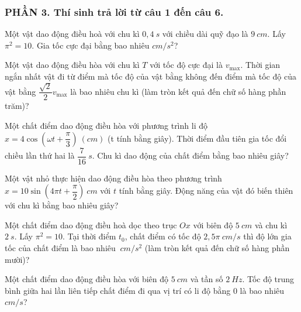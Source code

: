 \subsubsection*{PHẦN 3. Thí sinh trả lời từ câu 1 đến câu 6.}
\setcounter{ex}{0}
\begin{ex}
	Một vật dao động điều hoà với chu kì $0,4\ s$ với chiều dài quỹ đạo là $9\ cm$. Lấy $\pi^2=10$. Gia tốc cực đại bằng bao nhiêu $cm/s^2$?
\end{ex}
\begin{ex}
	Một vật dao động điều hòa với chu kì $T$ với tốc độ cực đại là $v_{\text {max}}$. Thời gian ngắn nhất vật đi từ điểm mà tốc độ của vật bằng không đến điểm mà tốc độ của vật bằng $\dfrac{\sqrt{2}}{2}v_{\max}$ là bao nhiêu chu kì (làm tròn kết quả đến chữ số hàng phần trăm)?
\end{ex}
\begin{ex}
	Một chất điểm dao động điều hòa với phương trình li độ $x=4 \cos (\omega t+\dfrac{\pi}{3}) \ (cm)$ (t tính bằng giây). Thời điểm đầu tiên gia tốc đổi chiều lần thứ hai là $\dfrac{7}{16}\ s$. Chu kì dao động của chất điểm bằng bao nhiêu giây?
\end{ex}
\begin{ex}
	Một vật nhỏ thực hiện dao động điều hòa theo phương trình $x=10 \sin \left(4 \pi t+\dfrac{\pi}{2}\right)\ cm$ với $t$ tính bằng giây. Động năng của vật đó biến thiên với chu kì bằng bao nhiêu giây?\\
\end{ex}
\begin{ex}
	Một chất điểm dao động điều hoà dọc theo trục $O x$ với biên độ $5 \ cm$ và chu kì $2 \ s$. Lấy $\pi^2=10$. Tại thời điểm $t_0$, chất điểm có tốc độ $2,5 \pi\ cm/s$ thì độ lớn gia tốc của chất điểm là bao nhiêu $\ cm/s^2$ (làm tròn kết quả đến chữ số hàng phần mười)?
	 
\end{ex}
\begin{ex}%
	Một chất điểm dao động điều hòa với biên độ $5\ cm$ và tần số $2\ Hz$. Tốc độ trung bình giữa hai lần liên tiếp chất điểm đi qua vị trí có li độ bằng $0$ là bao nhiêu $cm/s$?\\
\end{ex}
